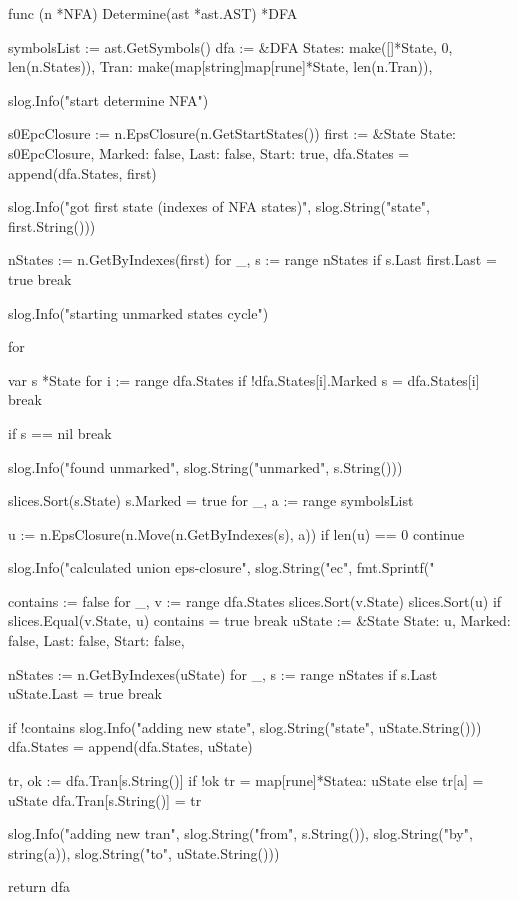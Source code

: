 func (n *NFA) Determine(ast *ast.AST) *DFA {
	symbolsList := ast.GetSymbols()
	dfa := &DFA{
		States: make([]*State, 0, len(n.States)),
		Tran:   make(map[string]map[rune]*State, len(n.Tran)),
	}

	slog.Info("start determine NFA")

	s0EpcClosure := n.EpsClosure(n.GetStartStates())
	first := &State{
		State:  s0EpcClosure,
		Marked: false,
		Last:   false,
		Start:  true,
	}
	dfa.States = append(dfa.States, first)

	slog.Info("got first state (indexes of NFA states)", slog.String("state", first.String()))

	nStates := n.GetByIndexes(first)
	for _, s := range nStates {
		if s.Last {
			first.Last = true
			break
		}
	}

	slog.Info("starting unmarked states cycle")

	for {
		var s *State
		for i := range dfa.States {
			if !dfa.States[i].Marked {
				s = dfa.States[i]
				break
			}
		}

		if s == nil {
			break
		}

		slog.Info("found unmarked", slog.String("unmarked", s.String()))

		slices.Sort(s.State)
		s.Marked = true
		for _, a := range symbolsList {
			u := n.EpsClosure(n.Move(n.GetByIndexes(s), a))
			if len(u) == 0 {
				continue
			}

			slog.Info("calculated union eps-closure", slog.String("ec", fmt.Sprintf("%

			contains := false
			for _, v := range dfa.States {
				slices.Sort(v.State)
				slices.Sort(u)
				if slices.Equal(v.State, u) {
					contains = true
					break
				}
			}
			uState := &State{
				State:  u,
				Marked: false,
				Last:   false,
				Start:  false,
			}

			nStates := n.GetByIndexes(uState)
			for _, s := range nStates {
				if s.Last {
					uState.Last = true
					break
				}
			}

			if !contains {
				slog.Info("adding new state", slog.String("state", uState.String()))
				dfa.States = append(dfa.States, uState)
			}

			tr, ok := dfa.Tran[s.String()]
			if !ok {
				tr = map[rune]*State{a: uState}
			} else {
				tr[a] = uState
			}
			dfa.Tran[s.String()] = tr

			slog.Info("adding new tran", slog.String("from", s.String()), slog.String("by", string(a)), slog.String("to", uState.String()))
		}
	}

	return dfa
}
